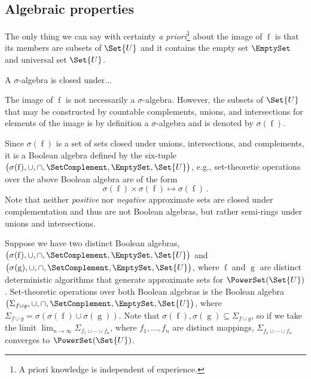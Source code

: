 \documentclass[ ../main.tex]{subfiles}
\begin{document}
\subsection{Algebraic properties}
The only thing we can say with certainty \emph{a priori}\footnote{A priori knowledge is independent of experience.} about the image of $\operatorname{f}$ is that its members are subsets of $\Set{U}$ and it contains the empty set $\EmptySet$ and universal set $\Set{U}$.
\begin{definition}
A $\sigma$-algebra is closed under...
\end{definition}
The image of $\operatorname{f}$ is not necessarily a $\sigma$-algebra.
However, the subsets of $\Set{U}$ that may be constructed by countable complements, unions, and intersections for elements of the image is by definition a $\sigma$-algebra and is denoted by $\sigma(\operatorname{f})$.

Since $\sigma(\operatorname{f})$ is a set of sets closed under unions, intersections, and complements, it is a Boolean algebra defined by the six-tuple 
$\left(
    \sigma(\operatorname{f}), \cup, \cap, \SetComplement, \EmptySet,\Set{U}
\right)$,
e.g., set-theoretic operations over the above Boolean algebra are of the form
\begin{equation}
    \sigma(\operatorname{f}) \times \sigma(\operatorname{f}) 
        \mapsto \sigma(\operatorname{f})\,.
\end{equation}
Note that neither \emph{positive} nor \emph{negative} approximate sets are closed under complementation and thus are not Boolean algebras, but rather semi-rings under unions and intersections.

Suppose we have two distinct Boolean algebras,
$\left(
    \sigma(\operatorname{f}), \cup, \cap, \SetComplement, \EmptySet,\Set{U}
\right)$ and 
$\left(
    \sigma(\operatorname{g}), \cup, \cap, \SetComplement, \EmptySet,\Set{U}
\right)$,
where $\operatorname{f}$ and $\operatorname{g}$ are distinct deterministic algorithms that generate approximate sets for $\PowerSet(\Set{U})$.
Set-theoretic operations over both Boolean algebras is the Boolean algebra
$\left(
    \Sigma_{f \cup g}, \cup, \cap, \SetComplement, \EmptySet,\Set{U}
\right)$,
where $\Sigma_{f \cup g} = 
    \sigma\!\left(\sigma(\operatorname{f}) \cup \sigma(\operatorname{g})
\right)$.
Note that $\sigma(\operatorname{f}), \sigma(\operatorname{g}) 
    \subseteq \Sigma_{f \cup g}$,
so if we take the limit
    $\lim_{n \to \infty} \Sigma_{f_1 \cup \cdots \cup f_n}$,
where $f_1,\ldots,f_n$ are distinct mappings, $\Sigma_{f_1 \cup \cdots \cup f_n}$ converges to $\PowerSet(\Set{U})$.
\end{document}
